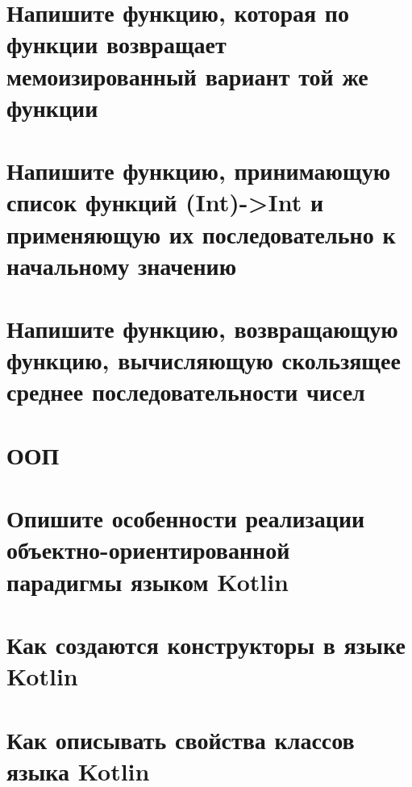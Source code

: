\documentclass[12pt]{article}
\begin{document}
\section*{Напишите функцию, которая по функции возвращает мемоизированный вариант той же функции}
\begin{enumerate}[leftmargin=*]
\end{enumerate}
\vspace{2mm}
\section*{Напишите функцию, принимающую список функций (Int)->Int и применяющую их последовательно к начальному значению}
\begin{enumerate}[leftmargin=*]
\end{enumerate}
\vspace{2mm}
\section*{Напишите функцию, возвращающую функцию, вычисляющую скользящее среднее последовательности чисел}
\begin{enumerate}[leftmargin=*]
\end{enumerate}
\vspace{2mm}
\section*{ООП}
\begin{enumerate}[leftmargin=*]
\end{enumerate}
\vspace{2mm}
\section*{Опишите особенности реализации объектно-ориентированной парадигмы языком Kotlin}
\begin{enumerate}[leftmargin=*]
\end{enumerate}
\vspace{2mm}
\section*{Как создаются конструкторы в языке Kotlin}
\begin{enumerate}[leftmargin=*]
\end{enumerate}
\vspace{2mm}
\section*{Как описывать свойства классов языка Kotlin}
\begin{enumerate}[leftmargin=*]
\end{enumerate}
\vspace{2mm}
\end{document}
